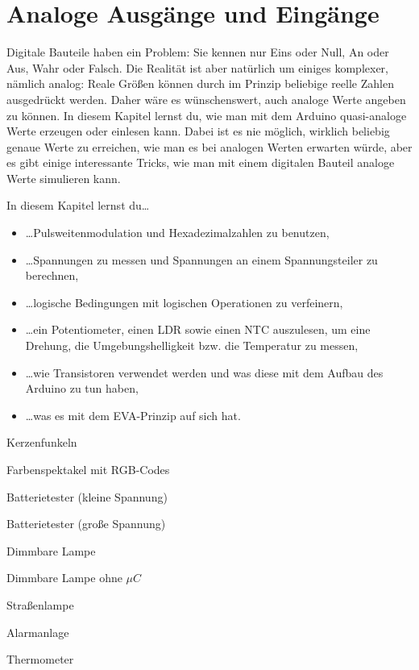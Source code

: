 \chapter{Analoge Ausgänge und Eingänge}
Digitale Bauteile haben ein Problem: Sie kennen nur Eins oder Null, An oder Aus, Wahr oder Falsch. Die Realität ist aber natürlich um einiges komplexer, nämlich analog: Reale Größen können durch im Prinzip beliebige reelle Zahlen ausgedrückt werden. Daher wäre es wünschenswert, auch analoge Werte angeben zu können. In diesem Kapitel lernst du, wie man mit dem Arduino quasi-analoge Werte erzeugen oder einlesen kann. Dabei ist es nie möglich, wirklich beliebig genaue Werte zu erreichen, wie man es bei analogen Werten erwarten würde, aber es gibt einige interessante Tricks, wie man mit einem digitalen Bauteil analoge Werte simulieren kann.

\bigskip
In diesem Kapitel lernst du\dots
\begin{itemize}
	\item \dots Pulsweitenmodulation und Hexadezimalzahlen zu benutzen,
	\item \dots Spannungen zu messen und Spannungen an einem Spannungsteiler zu berechnen,
	\item \dots logische Bedingungen mit logischen Operationen zu verfeinern,
	\item \dots ein Potentiometer, einen LDR sowie einen NTC auszulesen, um eine Drehung, die Umgebungshelligkeit bzw. die Temperatur zu messen,
	\item \dots wie Transistoren verwendet werden und was diese mit dem Aufbau des Arduino zu tun haben,
	\item \dots was es mit dem EVA-Prinzip auf sich hat.
\end{itemize}

\bigskip

\begin{projektueberblick}
	\item Kerzenfunkeln \dotfill \pageref{proj:kerzen}
	\item Farbenspektakel mit RGB-Codes \dotfill \pageref{proj:rgbled2}
	\item Batterietester (kleine Spannung) \dotfill \pageref{proj:batterietesterklein}
	\item Batterietester (große Spannung) \dotfill \pageref{proj:batterietestergross}
	\item Dimmbare Lampe \dotfill \pageref{proj:dimmlampe}
	\item Dimmbare Lampe ohne $\mu C$ \dotfill \pageref{proj:dimmlampeomc}
	\item Straßenlampe \dotfill \pageref{proj:strassenlampe}
	\item Alarmanlage \dotfill \pageref{proj:alarmanlage}
	\item Thermometer \dotfill \pageref{proj:thermometer}
\end{projektueberblick}
\newpage

